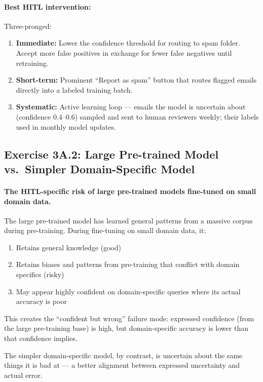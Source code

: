 \paragraph{Best HITL intervention:} Three-pronged:
\begin{enumerate}
    \item \textbf{Immediate:} Lower the confidence threshold for routing to spam folder. Accept more false positives in exchange for fewer false negatives until retraining.
    \item \textbf{Short-term:} Prominent ``Report as spam'' button that routes flagged emails directly into a labeled training batch.
    \item \textbf{Systematic:} Active learning loop --- emails the model is uncertain about (confidence 0.4--0.6) sampled and sent to human reviewers weekly; their labels used in monthly model updates.
\end{enumerate}

\subsection{Exercise 3A.2: Large Pre-trained Model vs.\ Simpler Domain-Specific Model}

\paragraph{The HITL-specific risk of large pre-trained models fine-tuned on small domain data.}

The large pre-trained model has learned general patterns from a massive corpus during pre-training. During fine-tuning on small domain data, it:
\begin{enumerate}
    \item Retains general knowledge (good)
    \item Retains biases and patterns from pre-training that conflict with domain specifics (risky)
    \item May appear highly confident on domain-specific queries where its actual accuracy is poor
\end{enumerate}

This creates the ``confident but wrong'' failure mode: expressed confidence (from the large pre-training base) is high, but domain-specific accuracy is lower than that confidence implies.

The simpler domain-specific model, by contrast, is uncertain about the same things it is bad at --- a better alignment between expressed uncertainty and actual error.

